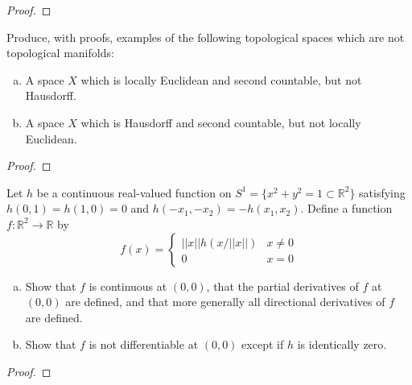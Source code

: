 \documentclass{article}
\newenvironment{problem}[2][Problem]{\begin{trivlist}
\item[\hskip \labelsep {\bfseries #1}\hskip \labelsep {\bfseries #2.}]}{\end{trivlist}}
\begin{document}
\begin{proof}
\end{proof}

\pagebreak

\begin{problem}{5}
  Produce, with proofs, examples of the following topological spaces which are
  not topological manifolds: \begin{enumerate}[a)]
    \item A space $X$ which is locally Euclidean and second countable,
      but not Hausdorff.
    \item A space $X$ which is Hausdorff and second countable, but not locally
      Euclidean.
  \end{enumerate}
\end{problem}

\begin{proof}
\end{proof}

\pagebreak

\begin{problem}{6}
  Let $h$ be a continuous real-valued function on
  $S^1 = \{x^2 + y^2 = 1 \subset \mathbb{R}^2\}$ satisfying
  $h(0, 1) = h(1, 0) = 0$ and $h(-x_1, -x_2) = -h(x_1, x_2)$.
  Define a function $f: \mathbb{R}^2 \rightarrow \mathbb{R}$ by \[
    f(x) = \begin{cases}
      ||x||h(x/||x||) & x \not= 0 \\
      0 & x = 0
    \end{cases}
  \]
  \begin{enumerate}[a)]
    \item Show that $f$ is continuous at $(0, 0)$,
      that the partial derivatives of $f$ at $(0, 0)$ are defined,
      and that more generally all directional derivatives of $f$ are defined.

    \item Show that $f$ is not differentiable at $(0, 0)$
      except if $h$ is identically zero.
  \end{enumerate}
\end{problem}

\begin{proof}
\end{proof}
\end{document}
